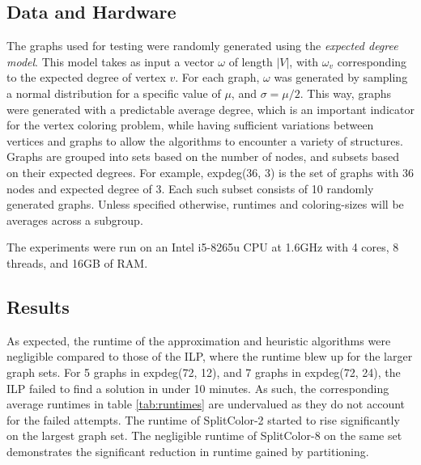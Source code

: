\documentclass[twocolumn]{article}
\begin{document}
\subsection{Data and Hardware}%
\label{sub:Data and Hardware}
The graphs used for testing were randomly generated using the \emph{expected degree model}. This model takes as input a vector $\omega$ of length $|V|$, with $\omega_v$ corresponding to the expected degree of vertex $v$. For each graph, $\omega$ was generated by sampling a normal distribution for a specific value of $\mu$, and $\sigma = \mu / 2$. This way, graphs were generated with a predictable average degree, which is an important indicator for the vertex coloring problem, while having sufficient variations between vertices and graphs to allow the algorithms to encounter a variety of structures. Graphs are grouped into sets based on the number of nodes, and subsets based on their expected degrees. For example, expdeg(36, 3) is the set of graphs with 36 nodes and expected degree of 3. Each such subset consists of 10 randomly generated graphs. Unless specified otherwise, runtimes and coloring-sizes will be averages across a subgroup.

The experiments were run on an Intel i5-8265u CPU at 1.6GHz with 4 cores, 8 threads, and 16GB of RAM.

\subsection{Results}%
\label{sub:Results}
As expected, the runtime of the approximation and heuristic algorithms were negligible compared to those of the ILP, where the runtime blew up for the larger graph sets. For 5 graphs in expdeg(72, 12), and 7 graphs in expdeg(72, 24), the ILP failed to find a solution in under 10 minutes. As such, the corresponding average runtimes in table \ref{tab:runtimes} are undervalued as they do not account for the failed attempts. The runtime of SplitColor-2 started to rise significantly on the largest graph set. The negligible runtime of SplitColor-8 on the same set demonstrates the significant reduction in runtime gained by partitioning.
\end{document}
